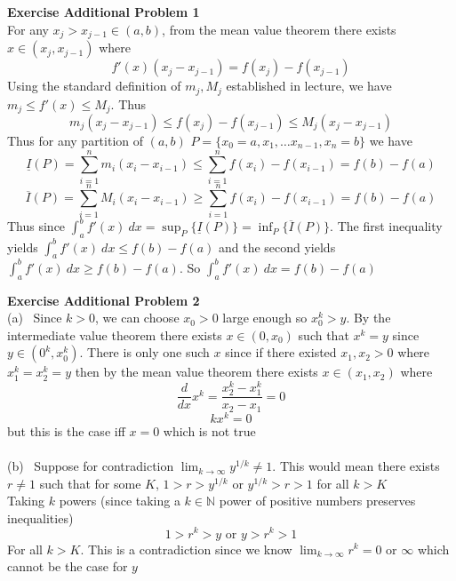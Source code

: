 \documentclass[12pt]{article}
\newenvironment{ques}[1]{\textbf{Exercise #1}\vspace{1 mm}\\ }{\bigskip}
\theoremstyle{definition}
\newcommand{\N}{\mathbb N}
\begin{document}
\begin{ques}{Additional Problem 1}
	For any $x_j > x_{j-1} \in (a,b)$, from the mean value theorem there exists
	$x \in (x_j,x_{j-1})$ where 
	$$f'(x)(x_j - x_{j-1}) = f(x_j) - f(x_{j-1})$$
	Using the standard definition of $m_j, M_j$ established in lecture, we have
	$m_j \leq f'(x) \leq M_j$. Thus
	$$m_j(x_j - x_{j-1}) \leq f(x_j) - f(x_{j-1}) \leq M_j(x_j - x_{j-1})$$
	Thus for any partition of $(a,b)$ $P = \{x_0 = a, x_1, \dots x_{n-1}, x_n =
	b\}$ we have
	$$\underline{I}(P) = \sum_{i = 1}^n m_i(x_i - x_{i-1}) \leq \sum_{i=1}^n
	f(x_i) - f(x_{i-1}) = f(b) - f(a)$$
	$$\overline{I}(P) = \sum_{i = 1}^n M_i(x_i - x_{i-1}) \geq \sum_{i=1}^n
	f(x_i) - f(x_{i-1}) = f(b) - f(a)$$
	Thus since $\int_a^bf'(x) \ dx = \sup_P \{\underline{I}(P)\} = \inf_P
	\{\overline{I}(P)\}$. The first inequality yields $\int_a^b f'(x) \ dx \leq
	f(b) - f(a)$ and the second yields $\int_a^b f'(x) \ dx \geq f(b) - f(a)$.
	So $\int_a^b f'(x) \ dx = f(b) - f(a)$
\end{ques}

\begin{ques}{Additional Problem 2}
	(a) \ Since $k>0$, we can choose $x_0 > 0$ large enough so $x_0^k > y$. By
	the intermediate value theorem there exists $x \in (0, x_0)$ such that $x^k
	= y$ since $y \in (0^k, x_0^k)$. There is only one such $x$ since if there
	existed $x_1, x_2 > 0$ where $x_1^k = x_2^k = y$ then by the mean value
	theorem there exists $x \in (x_1,x_2)$ where 
	$$\frac d {dx} x^k = \frac{x_2^k - x_1^k}{x_2 - x_1} = 0$$
	$$kx^k = 0$$
	but this is the case iff $x = 0$ which is not true\\
	\\
	(b) \ Suppose for contradiction $\lim_{k \to \infty} y^{1/k} \neq 1$. This
	would mean there exists $r \neq 1$ such that for some $K$, $1 > r >
	y^{1/k}$ or $y^{1/k} > r > 1$ for all $k > K$\\
	Taking $k$ powers (since taking a $k \in \N$ power of positive numbers
	preserves inequalities)
	$$1 > r^k > y \text{ or } y > r^k > 1$$
	For all $k > K$. This is a contradiction since we know $\lim_{k \to \infty}
	r^k = 0$ or $\infty$ which cannot be the case for $y$
\end{ques}
\end{document}
